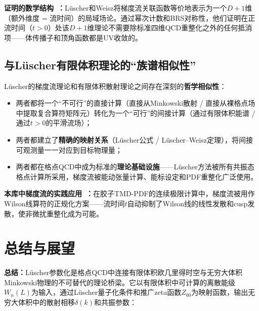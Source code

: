 \documentclass[12pt,a4paper]{ctexart}
\theoremstyle{definition}
\begin{document}
\textbf{证明的数学结构~\cite{gradFlow2026}：}L\"uscher和Weisz将梯度流关联函数等价地表示为一个$D+1$维（额外维度 = 流时间）的局域场论。通过幂次计数和BRS对称性，他们证明在正流时间（$t > 0$）处该$D+1$维理论不需要除标准四维QCD重整化之外的任何抵消项——体传播子和顶角函数都是UV收敛的。

\subsection{与L\"uscher有限体积理论的``族谱相似性''}

L\"uscher的梯度流理论和有限体积散射理论之间存在深刻的\textbf{哲学相似性}：
\begin{itemize}[leftmargin=*]
    \item 两者都将一个``不可行''的直接计算（直接从Minkowski散射 / 直接从裸格点场中提取复合算符矩阵元）转化为一个``可行''的间接计算（通过有限体积能谱 / 通过$t>0$的平滑流场）；
    \item 两者都建立了\textbf{精确的映射关系}（L\"uscher公式 / L\"uscher--Weisz定理），将间接可观测量一一对应到目标物理量；
    \item 两者都在格点QCD中成为标准的\textbf{理论基础设施}——L\"uscher方法被所有共振态格点计算所采用，梯度流被能动张量计算、能标设定和PDF重整化广泛使用。
\end{itemize}

\textbf{本库中梯度流的实践应用~\cite{gradFlow2026,gluonTMDContinuum2026}：}在胶子TMD-PDF的连续极限计算中，梯度流被用作Wilson线算符的正规化方案——流时间$t$自动抑制了Wilson线的线性发散和cusp发散，使非微扰重整化成为可能。

\section{总结与展望}

\textbf{总结：}L\"uscher参数化是格点QCD中连接有限体积欧几里得时空与无穷大体积Minkowski物理的不可替代的理论桥梁。它以有限体积中可计算的离散能级$W_n(L)$为输入，通过L\"uscher量子化条件和推广zeta函数$Z_{00}$为映射函数，输出无穷大体积中的散射相移$\delta(k)$和共振参数：
\end{document}
